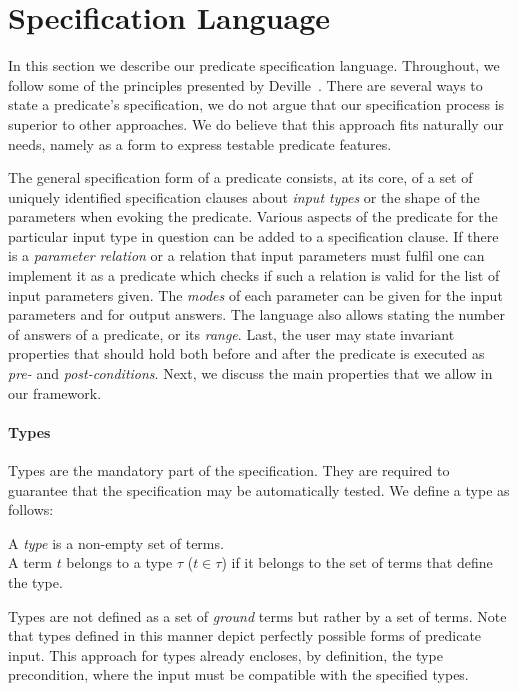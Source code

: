 
\section{Specification Language}
\label{sec:pred-spec}

In this section we describe our predicate specification language.
%
Throughout, we follow some of the principles presented
by Deville~\cite{Deville1990logprog}.
%
There are several ways to state a predicate's specification, we do not
argue that our specification process is superior to other approaches.
%
We do believe that this approach fits naturally our needs, namely as a
form to express testable predicate features. 


The general specification form of a predicate  consists, at its
core, of a set of uniquely identified specification clauses about
\emph{input types} or the shape of the parameters when evoking the
predicate.
%
Various aspects of the predicate for the particular input type in
question can be added to a specification clause.
%
If there is a \emph{parameter relation} or a relation that input
parameters must fulfil one can implement it as a predicate
which checks if such a relation is valid for the list of input
parameters given.
%
The \emph{modes} of each parameter can be given for the input parameters and
for output answers.
%
The language also allows stating the number of
answers of a predicate,
or its \emph{range}.
%
Last, the user may state invariant properties that should hold both
before and after the predicate is executed as \emph{pre-} and \emph{post-conditions}.
%
Next, we discuss the main properties that we allow in our framework.

\paragraph{\bf Types}

Types are the mandatory part of the specification.
%
They are required to guarantee that the specification may be
automatically tested.
%
We define a type as follows: 
%
\begin{definition}
\label{def:type}
A {\em type} is a non-empty set of terms.\\
A term $t$ belongs to a type $\tau$ ($t \in \tau$) if it belongs to the set of
terms that define the type.
\end{definition}


Types are not defined as a set of \emph{ground} terms but rather by
a set of terms.
%
Note that types defined in this manner depict perfectly possible forms of
predicate input.
%
This approach for types already encloses, by definition, the type
precondition, where the input must be compatible with the specified types.


